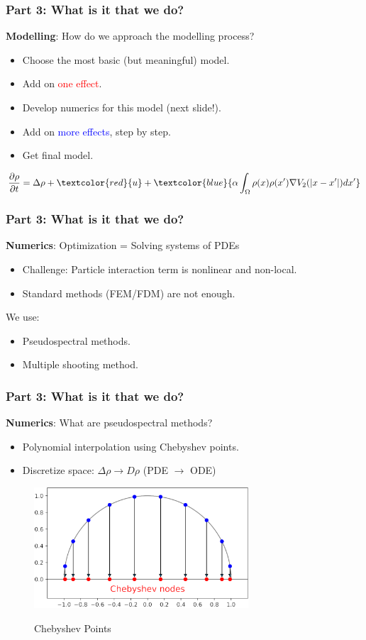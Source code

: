 \documentclass[aspectratio=169,xcolor=dvipsnames]{beamer}
\begin{document}
\begin{frame}
	\frametitle{Part 3: What is it that we do?}

		\textbf{Modelling}: How do we approach the modelling process?
\begin{itemize}
	\item Choose the most basic (but meaningful) model.
	\item Add on \textcolor{red}{one effect}.
	\item Develop numerics for this model (next slide!).
	\item Add on \textcolor{blue}{more effects}, step by step.
	\item Get final model.
\end{itemize}
\begin{align*}
\frac{\partial \rho}{\partial t}= \Delta \rho + \textcolor{red}{u} +\textcolor{blue}{\alpha \int_\Omega \rho(x) \rho(x') \nabla V_2(|x-x'|)dx'}
\end{align*}
\end{frame}
\begin{frame}
	\frametitle{Part 3: What is it that we do?}
\textbf{Numerics}: Optimization = Solving systems of PDEs
	\begin{itemize} 
		\item Challenge: Particle interaction term is nonlinear and non-local.
		\item Standard methods (FEM/FDM) are not enough.
	\end{itemize}
We use:
\begin{itemize}
		\item Pseudospectral methods.
		\item Multiple shooting method.
	\end{itemize}
\end{frame}

\begin{frame}
	\frametitle{Part 3: What is it that we do?}
\textbf{Numerics}: What are pseudospectral methods?\\
\begin{itemize}
	\item Polynomial interpolation using Chebyshev points.
	\item Discretize space: $\Delta \rho \to D \rho$ (PDE $\to$ ODE)
\end{itemize}
 
 
	\begin{figure}
	\includegraphics[width=8cm]{chebnodes1.png}\\
	\caption{Chebyshev Points}
\end{figure}	
\end{frame}
\end{document}
